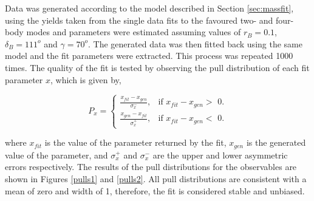 Data was generated according to the model described in Section \ref{sec:massfit}, using the yields taken from the single data fits to the favoured two- and four-body modes and \CP parameters were estimated assuming values of $r_B = 0.1$, $\delta_B = 111^o$ and $\gamma = 70^o$. The generated data was then fitted back using the same model and the fit parameters were extracted. This process was repeated 1000 times. The quality of the fit is tested by observing the pull distribution of each fit parameter $x$, which is given by,

\begin{equation*}
P_x = \begin{cases}
	\frac{x_{fit} - x_{gen}}{\sigma_x^-}, & \text{if $x_{fit} - x_{gen} >$ 0}. \\
	\frac{x_{gen} - x_{fit}}{\sigma_x^+}, & \text{if $x_{fit} - x_{gen} <$ 0}.
	\end{cases}
\end{equation*}

where $x_{fit}$ is the value of the parameter returned by the fit, $x_{gen}$ is the generated value of the parameter, and $\sigma_x^+$ and $\sigma_x^-$ are the upper and lower asymmetric errors respectively. The results of the pull distributions for the \CP observables are shown in Figures \ref{pulls1} and \ref{pulls2}. All pull distributions are consistent with a mean of zero and width of 1, therefore, the fit is considered stable and unbiased.
 
